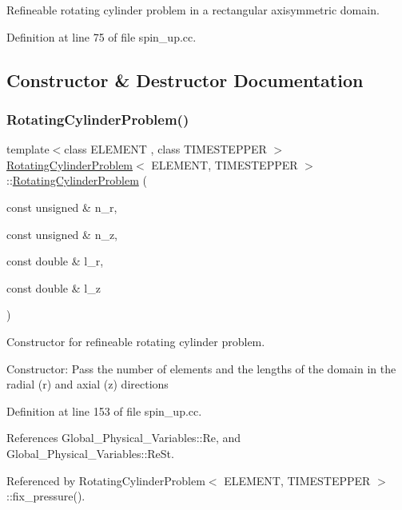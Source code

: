Refineable rotating cylinder problem in a rectangular axisymmetric domain. 

Definition at line 75 of file spin\+\_\+up.\+cc.



\subsection{Constructor \& Destructor Documentation}
\mbox{\label{classRotatingCylinderProblem_a436b0ff8c4ac33acfe10492c587ad80d}} 
\subsubsection{\texorpdfstring{Rotating\+Cylinder\+Problem()}{RotatingCylinderProblem()}}
{\footnotesize\ttfamily template$<$class E\+L\+E\+M\+E\+NT , class T\+I\+M\+E\+S\+T\+E\+P\+P\+ER $>$ \\
\hyperlink{classRotatingCylinderProblem}{Rotating\+Cylinder\+Problem}$<$ E\+L\+E\+M\+E\+NT, T\+I\+M\+E\+S\+T\+E\+P\+P\+ER $>$\+::\hyperlink{classRotatingCylinderProblem}{Rotating\+Cylinder\+Problem} (\begin{DoxyParamCaption}\item[{const unsigned \&}]{n\+\_\+r,  }\item[{const unsigned \&}]{n\+\_\+z,  }\item[{const double \&}]{l\+\_\+r,  }\item[{const double \&}]{l\+\_\+z }\end{DoxyParamCaption})}



Constructor for refineable rotating cylinder problem. 

Constructor\+: Pass the number of elements and the lengths of the domain in the radial (r) and axial (z) directions 

Definition at line 153 of file spin\+\_\+up.\+cc.



References Global\+\_\+\+Physical\+\_\+\+Variables\+::\+Re, and Global\+\_\+\+Physical\+\_\+\+Variables\+::\+Re\+St.



Referenced by Rotating\+Cylinder\+Problem$<$ E\+L\+E\+M\+E\+N\+T, T\+I\+M\+E\+S\+T\+E\+P\+P\+E\+R $>$\+::fix\+\_\+pressure().


